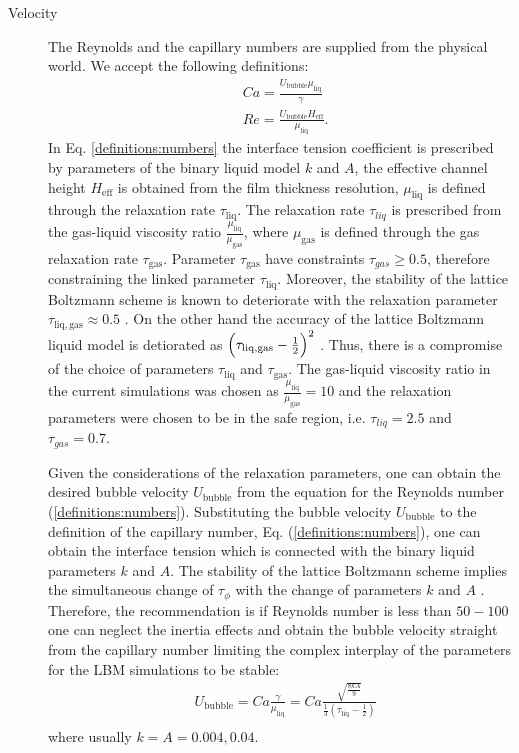 \documentclass{article}
\begin{document}
\begin{description}
\item[Velocity] The Reynolds and the capillary numbers are supplied from the physical world. We
accept the following definitions:
\begin{equation}
\label{definitions:numbers}
\begin{aligned}
&Ca=\frac{U_{\mathrm{bubble}} \mu_{\mathrm{liq}}}{\gamma} \\
&Re=\frac{U_{\mathrm{bubble}} H_{\mathrm{eff}}}{\mu_{\mathrm{liq}}}.
\end{aligned}
\end{equation}
In Eq. \eqref{definitions:numbers} the interface tension coefficient is prescribed by parameters of
the binary liquid model $k$ and $A$, the effective channel height $H_{\mathrm{eff}}$ is obtained
from the film thickness resolution, $\mu_{\mathrm{liq}}$ is defined through the relaxation rate
$\tau_{\mathrm{liq}}$. The relaxation rate $\tau_{liq}$ is prescribed from the gas-liquid viscosity
ratio $\frac{\mu_{\mathrm{liq}}}{\mu_{\mathrm{gas}}}$, where $\mu_{\mathrm{gas}}$ is defined through
the gas relaxation rate $\tau_{\mathrm{gas}}$. Parameter $\tau_{\mathrm{gas}}$ have constraints
$\tau_{gas}\geq 0.5$, therefore constraining the linked parameter $\tau_{\mathrm{liq}}$. Moreover,
the stability of the lattice Boltzmann scheme is known to deteriorate with the relaxation parameter
$\tau_{\mathrm{liq},\mathrm{gas}}\approx 0.5$ \cite{kuzmin-trt-stability}. On the other hand the
accuracy of the lattice Boltzmann liquid model is detiorated as
$\Bigl(\tau_{\mathrm{liq},\mathrm{gas}}-\frac{1}{2}\Bigr)^2$ \cite{ginzburg-trt-simple-hydro}. Thus,
there is a compromise of the choice of parameters $\tau_{\mathrm{liq}}$ and $\tau_{\mathrm{gas}}$.
The gas-liquid viscosity ratio in the current simulations was chosen as
$\frac{\mu_{\mathrm{liq}}}{\mu_{\mathrm{gas}}}=10$ and the relaxation parameters were chosen to be
in the safe region, i.e. $\tau_{liq}=2.5$ and $\tau_{gas}=0.7$. 

Given the considerations of the relaxation parameters, one can obtain the desired bubble velocity
$U_{\mathrm{bubble}}$ from the equation for the Reynolds number (\ref{definitions:numbers}).
Substituting the bubble velocity $U_{\mathrm{bubble}}$ to the definition of the capillary number,
Eq. (\ref{definitions:numbers}), one can obtain the interface tension which is connected with the
binary liquid parameters $k$ and $A$. The stability of the lattice Boltzmann scheme implies the
simultaneous change of $\tau_{\phi}$ with the change of parameters $k$ and $A$
\cite{pagonabarraga-parameters}. Therefore, the recommendation is if Reynolds number is less than
$50-100$ one can neglect the inertia effects and obtain the bubble velocity straight from the
capillary number limiting the complex interplay of the parameters for the LBM simulations to be
stable: 
\begin{equation}
\begin{aligned}
&U_{\mathrm{bubble}}=Ca \frac{\gamma}{\mu_{\mathrm{liq}}}=Ca \frac{\sqrt{\frac{8 k
A}{9}}}{\frac{1}{3}(\tau_{\mathrm{liq}}-\frac{1}{2})}\\
\end{aligned}
\end{equation}
where usually $k=A=0.004,0.04$.


\end{description}
\end{document}
